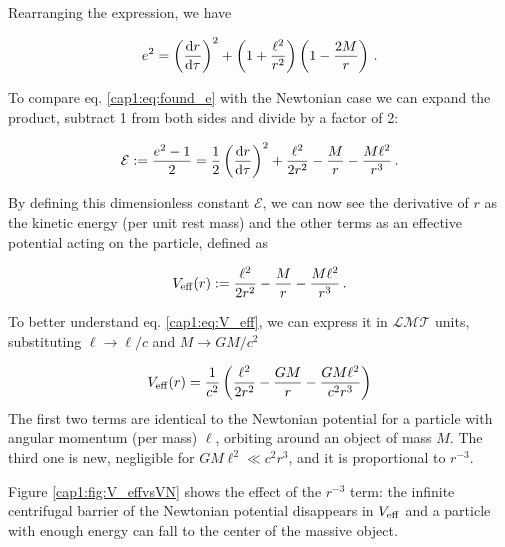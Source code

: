 Rearranging the expression, we have

\begin{equation}
    e^2 = \left(\dv{r}{\tau}\right)^2 + \left(1 + \frac{\ell^2}{r^2}\right)
    \left(1 - \frac{2M}{r} \right) \, .
   \label{cap1:eq:found_e}
\end{equation}

To compare eq. \ref{cap1:eq:found_e} with the Newtonian case we can expand
the product, subtract 1 from both sides and divide by a factor of 2:

\begin{equation}
    \mathcal E := \frac{e^2 - 1}{2} = \frac{1}{2} \left(\dv{r}{\tau}\right)^2
    + \frac{\ell^2}{2 r^2} - \frac{M}{r} - \frac{M \ell^2}{r^3} \, .
    \label{cap1:eq:found_epsilon}
\end{equation}

By defining this dimensionless constant $\mathcal E$, we can now see the
derivative of $r$ as the kinetic energy (per unit rest mass) and the other
terms as an effective potential acting on the particle, defined as

\begin{equation}
    V_{\rm eff}(r)
    := \frac{\ell^2}{2 r^2} - \frac{M}{r} - \frac{M \ell^2}{r^3} \, .
    \label{cap1:eq:V_eff}
\end{equation}

To better understand eq. \ref{cap1:eq:V_eff}, we can express it in
$\mathcal{LMT}$ units, substituting $\ell \rightarrow \ell / c$ and 
$ M \rightarrow G M / c^2$

\begin{equation*}
    V_{\rm eff}(r)
    = \frac{1}{c^2} \left( \frac{\ell^2}{2 r^2} - \frac{G M}{r}
    - \frac{G M \ell^2}{c^2 r^3} \right)
\end{equation*}
The first two terms are identical to the Newtonian potential for a particle
with angular momentum (per mass) $\ell$, orbiting around an object of mass $M$.
The third one is new, negligible for $GM\ell^2 \ll c^2 r^3$, and it is
proportional
to $r^{-3}$.

Figure \ref{cap1:fig:V_effvsVN} shows the effect of the $r^{-3}$ term: the
infinite centrifugal barrier of the Newtonian potential disappears in
$V_{\rm eff}$ and a particle with enough energy can fall to the center of the
massive object.

